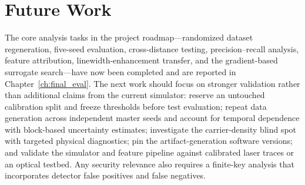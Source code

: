 \documentclass[12pt, a4paper]{report}
\begin{document}
\section{Future Work}
The core analysis tasks in the project roadmap—randomized dataset regeneration, five-seed evaluation, cross-distance testing, precision--recall analysis, feature attribution, linewidth-enhancement transfer, and the gradient-based surrogate search—have now been completed and are reported in Chapter~\ref{ch:final_eval}. The next work should focus on stronger validation rather than additional claims from the current simulator: reserve an untouched calibration split and freeze thresholds before test evaluation; repeat data generation across independent master seeds and account for temporal dependence with block-based uncertainty estimates; investigate the carrier-density blind spot with targeted physical diagnostics; pin the artifact-generation software versions; and validate the simulator and feature pipeline against calibrated laser traces or an optical testbed. Any security relevance also requires a finite-key analysis that incorporates detector false positives and false negatives.
\end{document}
